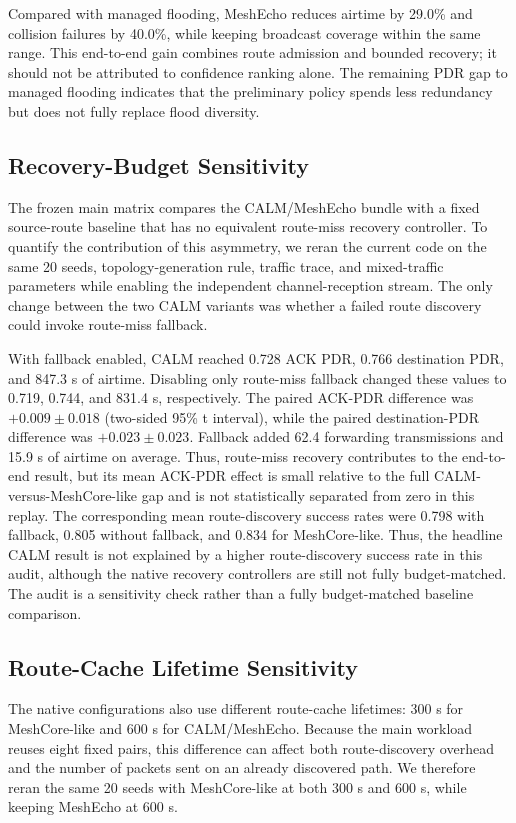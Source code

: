\documentclass[conference]{IEEEtran}
\begin{document}
    Compared with managed flooding, MeshEcho reduces airtime by 29.0\% and
    collision failures by 40.0\%, while keeping broadcast coverage within the same
    range. This end-to-end gain combines route admission and bounded recovery;
    it should not be attributed to confidence ranking alone. The remaining PDR
    gap to managed flooding indicates that the preliminary policy spends less
    redundancy but does not fully replace flood diversity.

\subsection{Recovery-Budget Sensitivity}

The frozen main matrix compares the CALM/MeshEcho bundle with a fixed
source-route baseline that has no equivalent route-miss recovery controller.
To quantify the contribution of this asymmetry, we reran the current code on
the same 20 seeds, topology-generation rule, traffic trace, and mixed-traffic
parameters while enabling the independent channel-reception stream. The only
change between the two CALM variants was whether a failed route discovery
could invoke route-miss fallback.

With fallback enabled, CALM reached 0.728 ACK PDR, 0.766 destination PDR, and
847.3 s of airtime. Disabling only route-miss fallback changed these values to
0.719, 0.744, and 831.4 s, respectively. The paired ACK-PDR difference was
$+0.009\pm0.018$ (two-sided 95\% t interval), while the paired destination-PDR
difference was $+0.023\pm0.023$. Fallback added 62.4 forwarding
transmissions and 15.9 s of airtime on average. Thus, route-miss recovery
contributes to the end-to-end result, but its mean ACK-PDR effect is small
relative to the full CALM-versus-MeshCore-like gap and is not statistically
separated from zero in this replay. The corresponding mean route-discovery
success rates were 0.798 with fallback, 0.805 without fallback, and 0.834 for
MeshCore-like. Thus, the headline CALM result is not explained by a higher
route-discovery success rate in this audit, although the native recovery
controllers are still not fully budget-matched. The audit is a sensitivity
check rather than a fully budget-matched baseline comparison.

\subsection{Route-Cache Lifetime Sensitivity}

The native configurations also use different route-cache lifetimes: 300 s for
MeshCore-like and 600 s for CALM/MeshEcho. Because the main workload reuses
eight fixed pairs, this difference can affect both route-discovery overhead and
the number of packets sent on an already discovered path. We therefore reran
the same 20 seeds with MeshCore-like at both 300 s and 600 s, while keeping
MeshEcho at 600 s.
\end{document}
